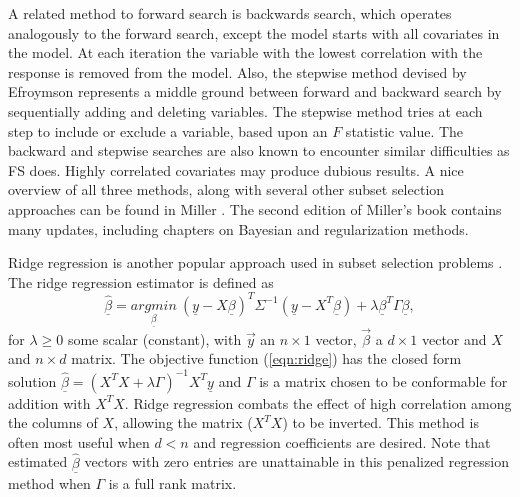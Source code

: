 A related method to forward search is backwards search, which operates analogously to the forward search, except the model starts with all covariates in the model. At each iteration the variable with the lowest correlation with the response is removed from the model. Also, the stepwise method devised by Efroymson \cite{efroymson1960multiple} represents a middle ground between forward and backward search by sequentially adding and deleting variables. The stepwise method tries at each step to include or exclude a variable, based upon an $F$ statistic value. The backward and stepwise searches are also known to encounter similar difficulties as FS \cite{miller2002subset} does. Highly correlated covariates may produce dubious results. A nice overview of all three methods, along with several other subset selection approaches can be found in Miller \cite{miller2002subset}. The second edition of Miller's book contains many updates, including chapters on Bayesian and regularization methods.  

 Ridge regression is another popular approach used in subset selection problems \cite{hoerl1970ridge}. The ridge regression estimator is defined as 
 \begin{equation}\label{eqn:ridge}
 \underline{\hat{\beta}}= \underset{\underline{\beta}}{argmin}\ (\underline{y} -X\underline{\beta})^T\Sigma^{-1}(\underline{y} -X^T\underline{\beta}) + \lambda\underline{\beta}^T\Gamma\underline{\beta},
 \end{equation}
for $\lambda\geq 0$ some scalar (constant), with $\vec{y}$ an $n \times 1$ vector, $\vec{\beta}$ a $d\times 1$ vector and $X$ and $n \times d $ matrix. The objective function (\ref{eqn:ridge}) has the closed form solution $\underline{\hat{\beta}} = (X^TX+\lambda\Gamma)^{-1}X^T\underline{y}$ and $\Gamma$ is a matrix chosen to be conformable for addition with $X^TX$. Ridge regression combats the effect of high correlation among the columns of $X$, allowing the matrix ($X^TX$) to be inverted. This method is often most useful when $d<n$ and regression coefficients are desired. Note that estimated $\hat{\underline{\beta}}$ vectors with zero entries are unattainable in this penalized regression method when $\Gamma$ is a full rank matrix.
 
